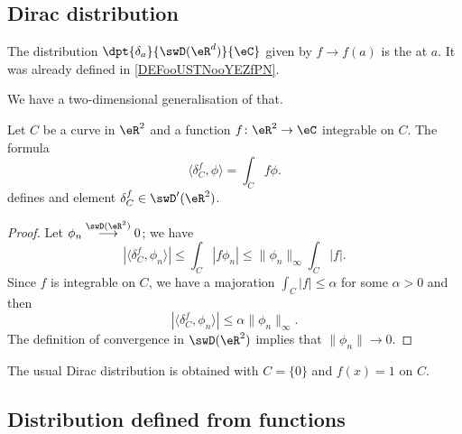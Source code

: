 \subsection{Dirac distribution}

The distribution $\dpt{\delta_a}{\swD(\eR^d)}{\eC}$ given by $f\to f(a)$ is the  at $a$. It was already defined in \ref{DEFooUSTNooYEZfPN}.

We have a two-dimensional generalisation of that.

\begin{lemmaDef}        \label{LEMooYABKooWPXIXZ}
    Let \( C\) be a curve in \( \eR^2\) and a function \( f\colon \eR^2\to \eC\) integrable on \( C\). The formula
    \begin{equation}
       \langle \delta_C^f, \phi\rangle =\int_Cf\phi.
    \end{equation}
    defines and element \( \delta_C^f\in \swD'(\eR^2) \).
\end{lemmaDef}

\begin{proof}
    Let \( \phi_n\stackrel{\swD(\eR^2)}{\longrightarrow}0\); we have
    \begin{equation}
        |\langle \delta_C^{f}, \phi_n\rangle |\leq\int_C|f\phi_n|\leq  \| \phi_n \|_{\infty}   \int_C| f |.
    \end{equation}
    Since \( f\) is integrable on \( C\), we have a majoration \( \int_C| f |\leq \alpha\) for some \( \alpha>0\) and then
    \begin{equation}
        |\langle \delta_C^{f}, \phi_n\rangle |\leq \alpha\| \phi_n \|_{\infty}.
    \end{equation}
    The definition of convergence in \( \swD(\eR^2)\) implies that \( \| \phi_n \|\to 0\).
\end{proof}

The usual Dirac distribution is obtained with \( C=\{ 0 \}\) and \( f(x)=1\) on $C$.

\subsection{Distribution defined from functions}


